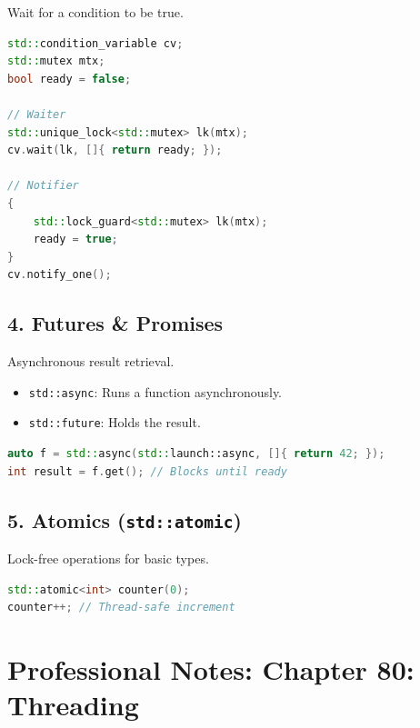 Wait for a condition to be true.

\begin{lstlisting}[language={C++}]
std::condition_variable cv;
std::mutex mtx;
bool ready = false;

// Waiter
std::unique_lock<std::mutex> lk(mtx);
cv.wait(lk, []{ return ready; });

// Notifier
{
    std::lock_guard<std::mutex> lk(mtx);
    ready = true;
}
cv.notify_one();
\end{lstlisting}

\hypertarget{futures-promises}{%
\section{4. Futures \& Promises}\label{futures-promises}}

Asynchronous result retrieval.

\begin{itemize}
\tightlist
\item
  \passthrough{\lstinline!std::async!}: Runs a function asynchronously.
\item
  \passthrough{\lstinline!std::future!}: Holds the result.
\end{itemize}

\begin{lstlisting}[language={C++}]
auto f = std::async(std::launch::async, []{ return 42; });
int result = f.get(); // Blocks until ready
\end{lstlisting}

\hypertarget{atomics-stdatomic}{%
\section{\texorpdfstring{5. Atomics
(\texttt{std::atomic})}{5. Atomics (std::atomic)}}\label{atomics-stdatomic}}

Lock-free operations for basic types.

\begin{lstlisting}[language={C++}]
std::atomic<int> counter(0);
counter++; // Thread-safe increment
\end{lstlisting}

\hypertarget{professional-notes-chapter-80-threading}{%
\chapter{Professional Notes: Chapter 80:
Threading}\label{professional-notes-chapter-80-threading}}

